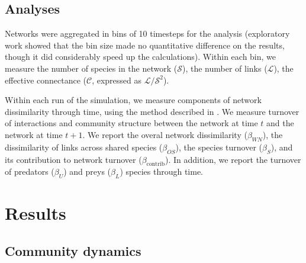 \documentclass[10pt,twocolumn,fleqn]{article}
\begin{document}
\subsection{Analyses}

Networks were aggregated in bins of 10 timesteps for the analysis
(exploratory work showed that the bin size made no quantitative difference on
the results, though it did considerably speed up the calculations). Within
each bin, we measure the number of species in the network ($\mathcal{S}$), the
number of links ($\mathcal{L}$), the effective connectance ($\mathcal{C}$, expressed as
$\mathcal{L}/\mathcal{S}^2$).

Within each run of the simulation, we measure components of network
dissimilarity through time, using the method described in
\textcite{poisot_dissimilarity_2012}. We measure turnover of interactions and
community structure between the network at time $t$ and the network at time
$t+1$. We report the overal network dissimilarity ($\beta_{WN}$), the
dissimilarity of links across shared species ($\beta_{OS}$), the species
turnover ($\beta_{S}$), and its contribution to network turnover
($\beta_{\mathrm{contrib}}$). In addition, we report the turnover of predators
($\beta_{U}$) and preys ($\beta_{L}$) species through time.

\section{Results}

\subsection{Community dynamics}
\end{document}
